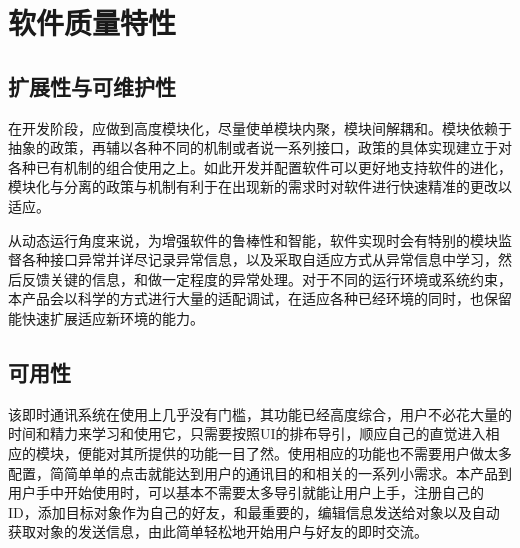 \chapter{软件质量特性}





\section{扩展性与可维护性}
在开发阶段，应做到高度模块化，尽量使单模块内聚，模块间解耦和。模块依赖于抽象的政策，再辅以各种不同的机制或者说一系列接口，政策的具体实现建立于对各种已有机制的组合使用之上。如此开发并配置软件可以更好地支持软件的进化，模块化与分离的政策与机制有利于在出现新的需求时对软件进行快速精准的更改以适应。

从动态运行角度来说，为增强软件的鲁棒性和智能，软件实现时会有特别的模块监督各种接口异常并详尽记录异常信息，以及采取自适应方式从异常信息中学习，然后反馈关键的信息，和做一定程度的异常处理。对于不同的运行环境或系统约束，本产品会以科学的方式进行大量的适配调试，在适应各种已经环境的同时，也保留能快速扩展适应新环境的能力。

\section{可用性}
该即时通讯系统在使用上几乎没有门槛，其功能已经高度综合，用户不必花大量的时间和精力来学习和使用它，只需要按照UI的排布导引，顺应自己的直觉进入相应的模块，便能对其所提供的功能一目了然。使用相应的功能也不需要用户做太多配置，简简单单的点击就能达到用户的通讯目的和相关的一系列小需求。本产品到用户手中开始使用时，可以基本不需要太多导引就能让用户上手，注册自己的ID，添加目标对象作为自己的好友，和最重要的，编辑信息发送给对象以及自动获取对象的发送信息，由此简单轻松地开始用户与好友的即时交流。


